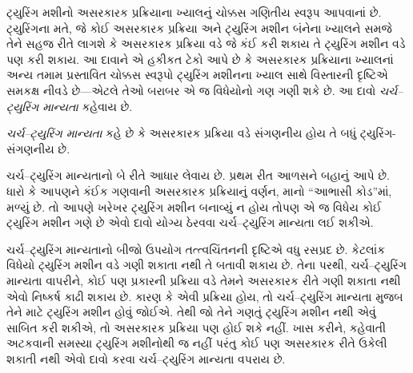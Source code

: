 \begingroup
\makeatletter{}\makeatother

\label{guunit:OLP-0263}


ટ્યુરિંગ મશીનો અસરકારક પ્રક્રિયાના ખ્યાલનું ચોક્કસ
ગણિતીય સ્વરૂપ આપવાનાં છે. ટ્યુરિંગના મતે, જે કોઈ
અસરકારક પ્રક્રિયા અને ટ્યુરિંગ મશીન બંનેના ખ્યાલને
સમજે તેને સહજ રીતે લાગશે કે અસરકારક પ્રક્રિયા વડે
જે કંઈ કરી શકાય તે ટ્યુરિંગ મશીન વડે પણ કરી શકાય.
આ દાવાને એ હકીકત ટેકો આપે છે કે અસરકારક પ્રક્રિયાના
ખ્યાલનાં અન્ય તમામ પ્રસ્તાવિત ચોક્કસ સ્વરૂપો ટ્યુરિંગ
મશીનના ખ્યાલ સાથે વિસ્તારની દૃષ્ટિએ સમકક્ષ નીવડે
છે---એટલે તેઓ બરાબર એ જ વિધેયોનો ગણ ગણી શકે છે.
આ દાવો \emph{ચર્ચ--ટ્યુરિંગ માન્યતા} કહેવાય છે.

\begin{defn}[ચર્ચ--ટ્યુરિંગ માન્યતા]
\emph{ચર્ચ--ટ્યુરિંગ માન્યતા} કહે છે કે અસરકારક
પ્રક્રિયા વડે સંગણનીય હોય તે બધું ટ્યુરિંગ-સંગણનીય છે.
\end{defn}

ચર્ચ--ટ્યુરિંગ માન્યતાનો બે રીતે આધાર લેવાય છે. પ્રથમ
રીત આળસને બહાનું આપે છે. ધારો કે આપણને કંઈક ગણવાની
અસરકારક પ્રક્રિયાનું વર્ણન, માનો ``આભાસી કોડ''માં,
મળ્યું છે. તો આપણે ખરેખર ટ્યુરિંગ મશીન બનાવ્યું ન
હોય તોપણ એ જ વિધેય કોઈ ટ્યુરિંગ મશીન ગણે છે એવો
દાવો યોગ્ય ઠેરવવા ચર્ચ--ટ્યુરિંગ માન્યતા લઈ શકીએ.

ચર્ચ--ટ્યુરિંગ માન્યતાનો બીજો ઉપયોગ તત્ત્વચિંતનની
દૃષ્ટિએ વધુ રસપ્રદ છે. કેટલાંક વિધેયો ટ્યુરિંગ મશીન
વડે ગણી શકાતા નથી તે બતાવી શકાય છે. તેના પરથી,
ચર્ચ--ટ્યુરિંગ માન્યતા વાપરીને, કોઈ પણ પ્રકારની પ્રક્રિયા
વડે તેમને અસરકારક રીતે ગણી શકાતા નથી એવો નિષ્કર્ષ
કાઢી શકાય છે. કારણ કે એવી પ્રક્રિયા હોય, તો
ચર્ચ--ટ્યુરિંગ માન્યતા મુજબ તેને માટે ટ્યુરિંગ મશીન
હોવું જોઈએ. તેથી જો તેને ગણતું ટ્યુરિંગ મશીન નથી
એવું સાબિત કરી શકીએ, તો અસરકારક પ્રક્રિયા પણ
હોઈ શકે નહીં. ખાસ કરીને, કહેવાતી અટકવાની સમસ્યા
ટ્યુરિંગ મશીનોથી જ નહીં પરંતુ કોઈ પણ અસરકારક રીતે
ઉકેલી શકાતી નથી એવો દાવો કરવા ચર્ચ--ટ્યુરિંગ
માન્યતા વપરાય છે.
\endgroup


\OLEndChapterHook
\endgroup


\begingroup
\makeatletter{}\makeatother

\label{guunit:OLP-0264}


\begingroup
\makeatletter{}\makeatother

\label{guunit:OLP-0265}


